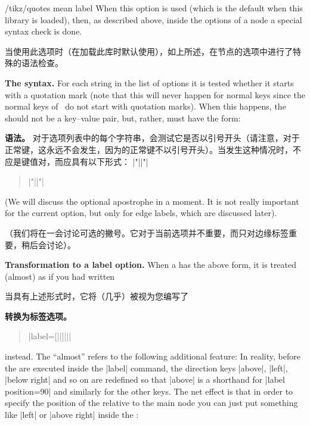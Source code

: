 \begin{key}{/tikz/quotes mean label}
    When this option is used (which is the default when this library is
    loaded), then, as described above, inside the options of a node a special
    syntax check is done.

    当使用此选项时（在加载此库时默认使用），如上所述，在节点的选项中进行了特殊的语法检查。

    \medskip
    \noindent\textbf{The syntax.}
    For each string in the list of options it is tested whether it starts with
    a quotation mark (note that this will never happen for normal keys since
    the normal keys of \tikzname\ do not start with quotation marks). When this
    happens, the  should not be a key--value pair, but, rather,
    must have the form:
    
    \noindent\textbf{语法。}
对于选项列表中的每个字符串，会测试它是否以引号开头（请注意，对于正常键，这永远不会发生，因为\tikzname 的正常键不以引号开头）。当发生这种情况时，不应是键值对，而应具有以下形式：
|"||"|
    \begin{quote}
        |"||"|
    \end{quote}

    (We will discuss the optional apostrophe in a moment. It is not really
    important for the current option, but only for edge labels, which are
    discussed later).

    （我们将在一会讨论可选的撇号。它对于当前选项并不重要，而只对边缘标签重要，稍后会讨论）。

    \medskip
    \noindent\textbf{Transformation to a label option.}
    When a  has the above form, it is treated (almost) as if you
    had written

    当具有上述形式时，它将（几乎）被视为您编写了

    \noindent\textbf{转换为标签选项。}
    \begin{quote}
        |label={[||]||}|
    \end{quote}
    instead. The ``almost'' refers to the following additional feature: In
    reality, before the  are executed inside the |label| command,
    the direction keys |above|, |left|, |below right| and so on are redefined
    so that |above| is a shorthand for |label position=90| and similarly for
    the other keys. The net effect is that in order to specify the position of
    the  relative to the main node you can just put something like
    |left| or |above right| inside the :
    

\end{key}
